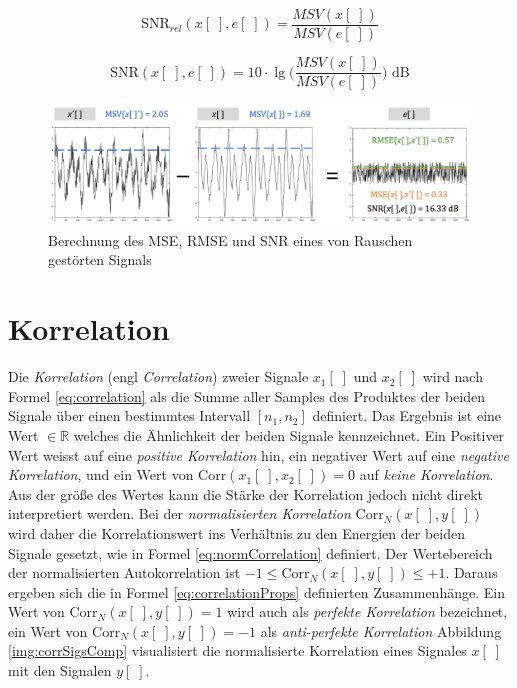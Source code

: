 
\begin{equation}
\text{SNR}_{rel}(x[\;],e[\;]) = \frac{MSV(x[\;])}{MSV(e[\;])}
\label{eq:snrPre}
\end{equation}

\begin{equation}
\text{SNR}(x[\;],e[\;]) = 10 \cdot  \lg \Big(\frac{MSV(x[\;])}{MSV(e[\;])} \Big) \text{ dB}
\label{eq:snrDb}
\end{equation}

\begin{figure}[h]
	\centering
	\includegraphics[width=1\textwidth]{bilder/snrStuff04.png}
	\caption{Berechnung des MSE, RMSE und SNR eines von Rauschen gestörten Signals}
	\label{img:snrStuff}
\end{figure}

\section{Korrelation}
\label{sec:correlation}

Die \emph{Korrelation} (engl \emph{Correlation}) zweier Signale $x_1[\;]$ und $x_2[\;]$ wird nach Formel \ref{eq:correlation} als die Summe aller Samples des Produktes der beiden Signale über einen bestimmtes Intervall $[n_1, n_2]$ definiert. Das Ergebnis ist eine Wert $\in \mathbb{R}$ welches die \glqq Ähnlichkeit der beiden Signale\grqq{} kennzeichnet. Ein Positiver Wert weisst auf eine \emph{positive Korrelation} hin, ein negativer Wert auf eine \emph{negative Korrelation}, und ein Wert von $\text{Corr}(x_1[\;],x_2[\;]) = 0$ auf \emph{keine Korrelation}. Aus der größe des Wertes kann die Stärke der Korrelation jedoch nicht direkt interpretiert werden. Bei der \emph{normalisierten Korrelation} Corr$_N(x[\;],y[\;])$ wird daher die Korrelationswert ins Verhältnis zu den Energien der beiden Signale gesetzt, wie in Formel \ref{eq:normCorrelation} definiert. Der Wertebereich der normalisierten Autokorrelation  ist $-1 \leq \text{Corr}_N(x[\;],y[\;]) \leq +1$. Daraus ergeben sich die in Formel \ref{eq:correlationProps} definierten Zusammenhänge. Ein Wert von $ \text{Corr}_N(x[\;],y[\;]) = 1$ wird auch als \emph{perfekte Korrelation} bezeichnet, ein Wert von  $ \text{Corr}_N(x[\;],y[\;]) = -1$ als \emph{anti-perfekte Korrelation} \cite[S. 46 - 47]{dspMichigan} Abbildung \ref{img:corrSigsComp} visualisiert die normalisierte Korrelation eines Signales $x[\;]$ mit den Signalen $y[\;]$.

